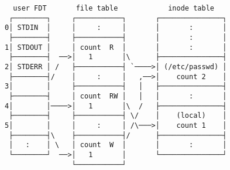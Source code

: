 \documentclass[varwidth,crop]{standalone}
\begin{document}
\begin{verbatim}
  user FDT       file table            inode table
 ┌────────┐     ┌───────────┐       ┌───────────────┐
0│ STDIN  │     │     :     │       │       :       │
 ├────────┤     ├───────────┤       │       :       │
1│ STDOUT │     │ count  R  │       │       :       │
 ├────────┤  ──>│   1       │\      ├───────────────┤
2│ STDERR │ /   ├───────────┤ `────>│ (/etc/passwd) │
 ├────────┤/    │     :     │   ,──>│    count 2    │
3│        │     ├───────────┤   │   ├───────────────┤
 ├────────┤     │ count  RW │   │   │       :       │
4│        │────>│   1       │\  /   ├───────────────┤
 ├────────┤     ├───────────┤ \/    │    (local)    │
5│        │     │     :     │ /\───>│    count 1    │
 ├────────┤\    ├───────────┤/      ├───────────────┤
 │   :    │ \   │ count  W  │       │       :       │
 └────────┘  ──>│   1       │       └───────────────┘
                └───────────┘
\end{verbatim}
\end{document}
